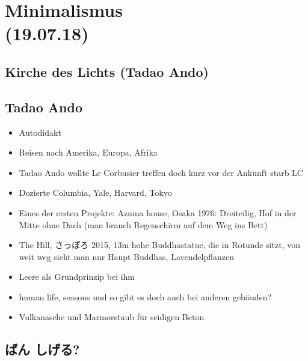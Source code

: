 \documentclass[emulatestandardclasses]{scrartcl}
\begin{document}
\section{Minimalismus
\\(19.07.18)}


\subsection{Kirche des Lichts (Tadao Ando)}



\subsection{Tadao Ando}

\begin{itemize}
  \item Autodidakt
  \item Reisen nach Amerika, Europa, Afrika
  \item Tadao Ando wollte Le Corbusier treffen doch kurz vor der Ankunft starb LC
  \item Dozierte Columbia, Yale, Harvard, Tokyo
  \item Eines der ersten Projekte: Azuma house, Osaka 1976: Dreiteilig, Hof in der Mitte ohne Dach (man brauch Regenschirm auf dem Weg ins Bett)
  \item The Hill, さっぽろ 2015, 13m hohe Buddhastatue, die in Rotunde sitzt, von weit weg sieht man nur Haupt Buddhas, Lavendelpflanzen
  \item Leere als Grundprinzip bei ihm
  \item human life, seasons und so gibt es doch auch bei anderen gebäuden?
  \item Vulkanasche und Marmorstaub für seidigen Beton
\end{itemize}

\subsection{ばん しげる?}
\end{document}
